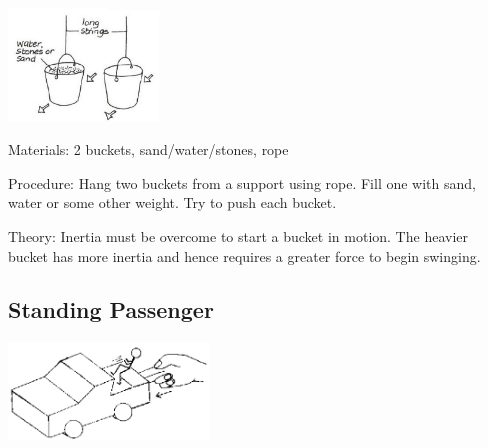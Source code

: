 \begin{multicols}{2}
\begin{center}
\includegraphics[width=0.3\textwidth]{./img/vso/bucket-pendulums.png}
\end{center}

\begin{description*}
\item[Materials:]{2 buckets, sand/water/stones, rope}
\item[Procedure:]{Hang two buckets from a support using rope. Fill one with sand, water or some other weight. Try to push each bucket.}
\item[Theory:]{Inertia must be overcome to start a bucket in motion. The heavier bucket has more inertia and hence requires a greater force to begin swinging.}
\end{description*}

\subsection{Standing Passenger}

\begin{center}
\includegraphics[width=0.4\textwidth]{./img/source/passenger.png}
\end{center}


\end{multicols}
